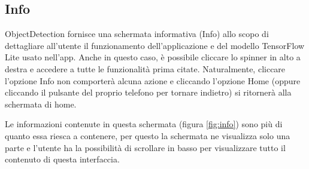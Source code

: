 \subsection{Info}
ObjectDetection fornisce una schermata informativa (Info) allo scopo di dettagliare all’utente il funzionamento dell’applicazione e del modello TensorFlow
Lite usato nell'app.
Anche in questo caso, è possibile cliccare lo spinner in alto a destra e accedere a tutte le funzionalità prima citate. Naturalmente, cliccare l’opzione
Info non comporterà alcuna azione e cliccando l’opzione Home (oppure cliccando il pulsante del proprio telefono per tornare indietro) si ritornerà alla schermata di home.

Le informazioni contenute in questa schermata (figura \ref{fig:info}) sono più di quanto essa riesca a contenere, per questo la schermata ne visualizza solo una parte e l’utente
ha la possibilità di scrollare in basso per visualizzare tutto il contenuto di questa interfaccia.

